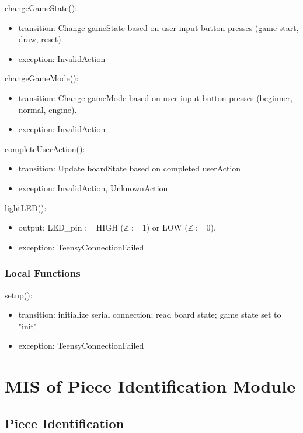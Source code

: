 \documentclass[12pt, titlepage]{article}
\begin{document}
\noindent changeGameState():
\begin{itemize}
\item transition: Change gameState based on user input button presses (game start, draw, reset).
\item exception: InvalidAction
\end{itemize}

\noindent changeGameMode():
\begin{itemize}
\item transition: Change gameMode based on user input button presses (beginner, normal, engine).
\item exception: InvalidAction
\end{itemize}

\noindent completeUserAction():
\begin{itemize}
\item transition: Update boardState based on completed userAction
\item exception: InvalidAction, UnknownAction
\end{itemize}

\noindent lightLED():
\begin{itemize}
\item output: LED\_pin := HIGH ($\mathbb{Z} := 1$) or LOW  ($\mathbb{Z} := 0$).
\item exception: TeensyConnectionFailed
\end{itemize}

\subsubsection{Local Functions}{
  \noindent setup():
  \begin{itemize}
  \item transition: initialize serial connection; read board state; game state set to "init"
  \item exception: TeensyConnectionFailed
  \end{itemize}
}

\newpage

\section{MIS of Piece Identification Module} \label{PieceIdentificationModule}

\subsection{Piece Identification}
\end{document}
